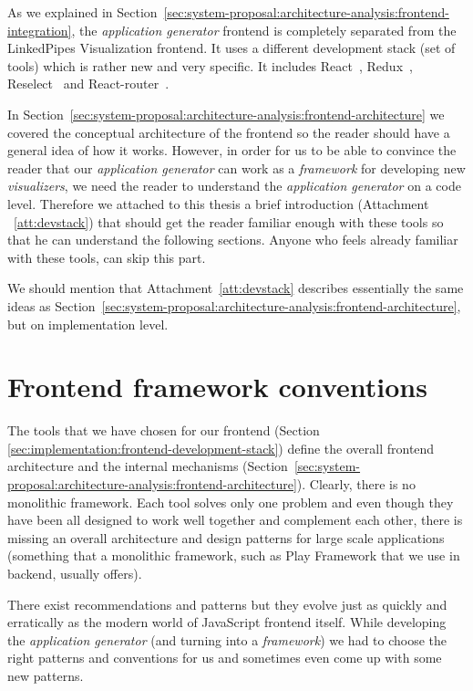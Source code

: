 As we explained in Section~\ref{sec:system-proposal:architecture-analysis:frontend-integration}, the \emph{application generator} frontend is completely separated from the LinkedPipes Visualization frontend. It uses a different development stack (set of tools) which is rather new and very specific. It includes React~\cite{react}, Redux~\cite{redux}, Reselect~\cite{reselect} and React-router~\cite{react-router}. 

In Section~\ref{sec:system-proposal:architecture-analysis:frontend-architecture} we covered the conceptual architecture of the frontend so the reader should have a general idea of how it works. However, in order for us to be able to convince the reader that our \emph{application generator} can work as a \emph{framework} for developing new \emph{visualizers}, we need the reader to understand the \emph{application generator} on a code level. Therefore we attached to this thesis a brief introduction (Attachment ~\ref{att:devstack}) that should get the reader familiar enough with these tools so that he can understand the following sections. Anyone who feels already familiar with these tools, can skip this part.

We should mention that Attachment~\ref{att:devstack} describes essentially the same ideas as Section~\ref{sec:system-proposal:architecture-analysis:frontend-architecture}, but on implementation level. 

\section{Frontend framework conventions}
\label{sec:implementation:frontend-conventions}

The tools that we have chosen for our frontend (Section \ref{sec:implementation:frontend-development-stack}) define the overall frontend architecture and the internal mechanisms (Section~\ref{sec:system-proposal:architecture-analysis:frontend-architecture}). Clearly, there is no monolithic framework. Each tool solves only one problem and even though they have been all designed to work well together and complement each other, there is missing an overall architecture and design patterns for large scale applications (something that a monolithic framework, such as Play Framework that we use in backend, usually offers).

There exist recommendations and patterns but they evolve just as quickly and erratically as the modern world of JavaScript frontend itself. While developing the \emph{application generator} (and turning into a \emph{framework}) we had to choose the right patterns and conventions for us and sometimes even come up with some new patterns.

